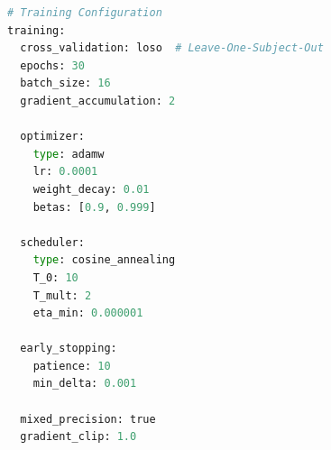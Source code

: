 \begin{lstlisting}[language=Python, caption={Training Configuration (training\_config.yaml)}]
# Training Configuration
training:
  cross_validation: loso  # Leave-One-Subject-Out
  epochs: 30
  batch_size: 16
  gradient_accumulation: 2

  optimizer:
    type: adamw
    lr: 0.0001
    weight_decay: 0.01
    betas: [0.9, 0.999]

  scheduler:
    type: cosine_annealing
    T_0: 10
    T_mult: 2
    eta_min: 0.000001

  early_stopping:
    patience: 10
    min_delta: 0.001

  mixed_precision: true
  gradient_clip: 1.0
\end{lstlisting}
